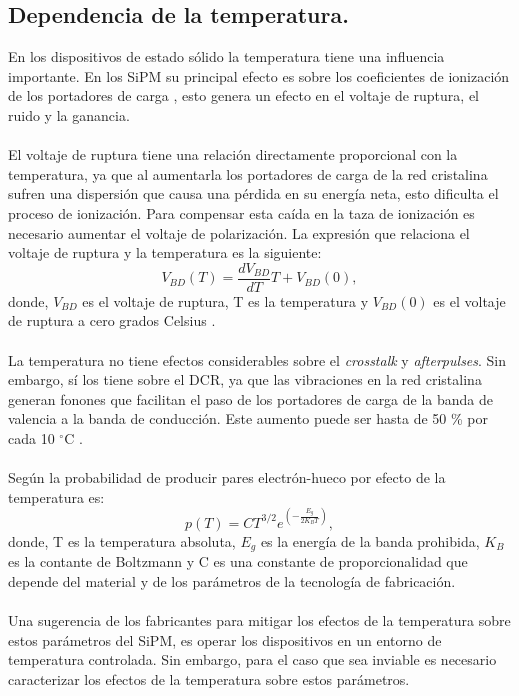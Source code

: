 \subsection{Dependencia de la temperatura.}
En los dispositivos de estado sólido la temperatura tiene una influencia importante. En los SiPM su principal efecto es sobre los coeficientes de ionización de los portadores de carga \citep{Temp_dependencia_APD}, esto genera un efecto en el voltaje de ruptura, el ruido y la ganancia.\\ \\
El voltaje de ruptura tiene una relación directamente proporcional con la temperatura, ya que al aumentarla los portadores de carga de la red cristalina sufren una dispersión  que causa una pérdida en su energía neta, esto dificulta el proceso de ionización. Para compensar esta caída en la taza de ionización es necesario aumentar el voltaje de polarización. La expresión que relaciona el voltaje de ruptura y la temperatura es la siguiente: 
\begin{equation}
    V_{BD}(T) = \frac{dV_{BD}}{dT}T+V_{BD}(0),
    \label{ruptura_eq}
\end{equation}
donde, $V_{BD}$ es el voltaje de ruptura, T es la temperatura y $V_{BD}(0)$ es el voltaje de ruptura a cero grados Celsius \citep{Charct_dep_temp}.  
\\ \\
La temperatura no tiene efectos considerables sobre el \textit{crosstalk} y \textit{afterpulses}. Sin embargo, sí los tiene sobre el DCR, ya que las vibraciones en la red cristalina generan fonones que facilitan el paso de los portadores de carga de la banda de valencia a la banda de conducción. Este aumento puede ser hasta de 50 \% por cada 10 $^\circ$C \citep{MPPC_note}.\\ \\
Según \citep{Charct_dep_temp} la probabilidad de producir pares electrón-hueco por efecto de la temperatura es:
\begin{equation}
    p(T) = CT^{3/2}e^{\left( -\frac{E_g}{2K_BT} \right)},
\end{equation}
donde, T es la temperatura absoluta, $E_g$ es la energía de la banda prohibida, $K_B$ es la contante de Boltzmann y C es una constante de proporcionalidad que depende del material y de los parámetros de la tecnología de fabricación.\\ \\
Una sugerencia de los fabricantes para mitigar los efectos de la temperatura sobre estos parámetros del SiPM, es operar los dispositivos en un entorno de temperatura controlada. Sin  embargo, para el caso  que sea inviable es necesario caracterizar los efectos de la temperatura sobre estos parámetros.      
